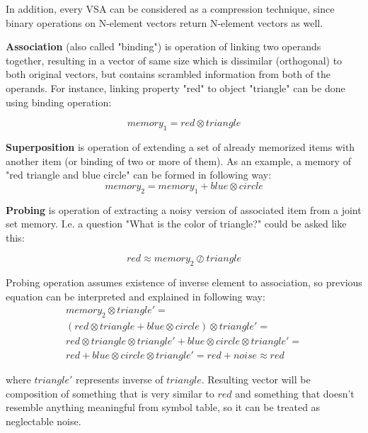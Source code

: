 \documentclass[conference]{IEEEtran}
\begin{document}
In addition, every VSA can be considered as a compression technique, since binary operations on N-element vectors return N-element vectors as well.

\textbf{Association} (also called "binding") is operation of linking two operands together, resulting in a vector of same size which is dissimilar (orthogonal) to both original vectors, but contains scrambled information from both of the operands. For instance, linking property "red" to object "triangle" can be done using binding operation:

\begin{equation}
memory_1 = red \otimes triangle
\end{equation}

\textbf{Superposition} is operation of extending a set of already memorized items with another item (or binding of two or more of them). As an example, a memory of "red triangle and blue circle" can be formed in following way:
\begin{equation}
memory_2 = memory_1 + blue \otimes circle
\end{equation}

\textbf{Probing} is operation of extracting a noisy version of associated item from a joint set memory. I.e. a question "What is the color of triangle?" could be asked like this:

\begin{equation}
red \approx memory_2 \oslash triangle
\end{equation}

Probing operation assumes existence of inverse element to association, so previous equation can be interpreted and explained in following way:
\begin{multline}
memory_2 \otimes triangle'=\\
(red \otimes triangle + blue \otimes circle) \otimes triangle'=\\
red \otimes triangle  \otimes triangle' + blue \otimes circle \otimes triangle' =\\
red + blue \otimes circle \otimes triangle'  = red + noise
\approx red
\end{multline}

where $triangle'$ represents inverse of $triangle$. Resulting vector will be composition of something that is very similar to $red$ and something that doesn't resemble anything meaningful from symbol table, so it can be treated as neglectable noise.
\end{document}
